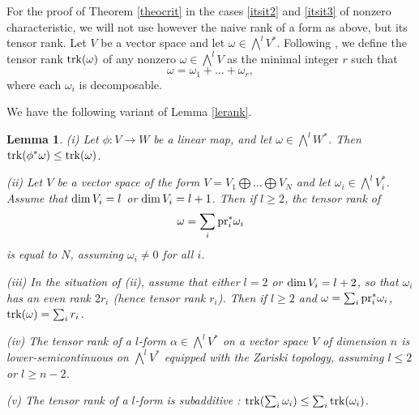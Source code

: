 \documentclass[10pt]{article}
\newtheorem{lemm}[theo]{Lemma}
\begin{document}
For the proof of Theorem \ref{theocrit} in the cases \ref{itsit2} and \ref{itsit3} of nonzero characteristic, we will not use however the naive rank of a form as above, but its tensor rank.
Let $V$ be a vector space and let
$\omega\in \bigwedge ^lV^*$. Following \cite{landsberg}, we define the tensor rank ${\rm trk}(\omega)$ of any nonzero $\omega\in\bigwedge^lV$ as the minimal integer $r$ such that
$$\omega=\omega_1+\ldots +\omega_r,$$
where each $\omega_i$ is decomposable.

We have  the following variant of Lemma \ref{lerank}.
\begin{lemm}\label{lerankprime} (i) Let $\phi: V\rightarrow W$ be a linear map, and let $\omega\in\bigwedge^l W^*$. Then ${\rm trk}(\phi^*\omega)\leq {\rm trk}(\omega)$.

(ii) Let $V$ be a vector space of the form $V=V_1\bigoplus \ldots\bigoplus V_N$ and let $\omega_i\in\bigwedge^lV_i^*$. Assume that ${\rm dim}\,V_i=l$ or ${\rm dim}\,V_i=l+1$. Then if $l\geq 2$, the tensor rank of \begin{eqnarray}\label{eqpouromegaprime} \omega=\sum_i{\rm pr}_i^*\omega_i\end{eqnarray} is equal to $N$, assuming $\omega_i\not=0$ for all $i$.

(iii)  In the situation of (ii), assume that either $l=2$ or ${\rm dim}\,V_i=l+2$, so that $\omega_i$ has an even rank $2r_i$ (hence tensor rank $r_i$). Then if $l\geq 2$  and  $ \omega=\sum_i{\rm pr}_i^*\omega_i$,   ${\rm trk}(\omega)=\sum_ir_i$.

(iv) The tensor rank of a $l$-form $\alpha\in \bigwedge^lV^* $ on  a vector space $V$ of dimension $n$ is lower-semicontinuous on $ \bigwedge^lV^* $ equipped with the Zariski topology, assuming $l\leq2$ or $l\geq n-2$.

(v) The tensor rank of a $l$-form is subadditive : ${\rm trk}(\sum_i\omega_i)\leq \sum_i{\rm trk}(\omega_i)$.
\end{lemm}
\end{document}

